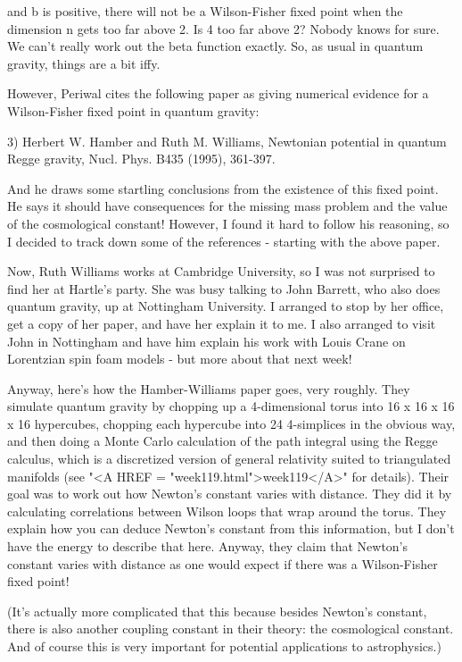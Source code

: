and b is positive, there will not be a Wilson-Fisher fixed point
when the dimension n gets too far above 2.  Is 4 too far above 2?
Nobody knows for sure.  We can't really work out the beta function
exactly.  So, as usual in quantum gravity, things are a bit iffy.

However, Periwal cites the following paper as giving numerical
evidence for a Wilson-Fisher fixed point in quantum gravity:

3) Herbert W. Hamber and Ruth M. Williams, Newtonian potential in 
quantum Regge gravity, Nucl. Phys. B435 (1995), 361-397.  

And he draws some startling conclusions from the existence of
this fixed point.  He says it should have consequences for the
missing mass problem and the value of the cosmological constant!
However, I found it hard to follow his reasoning, so I decided
to track down some of the references - starting with the above
paper.  

Now, Ruth Williams works at Cambridge University, so I was not
surprised to find her at Hartle's party.  She was busy talking
to John Barrett, who also does quantum gravity, up at Nottingham
University.  I arranged to stop by her office, get a copy of her 
paper, and have her explain it to me.  I also arranged to visit
John in Nottingham and have him explain his work with Louis Crane 
on Lorentzian spin foam models - but more about that next week!

Anyway, here's how the Hamber-Williams paper goes, very roughly.  
They simulate quantum gravity by chopping up a 4-dimensional torus 
into 16 x 16 x 16 x 16 hypercubes, chopping each hypercube into 24 
4-simplices in the obvious way, and then doing a Monte Carlo calculation 
of the path integral using the Regge calculus, which is a discretized 
version of general relativity suited to triangulated manifolds (see 
"<A HREF = "week119.html">week119</A>" for details).  Their goal 
was to work out how Newton's 
constant varies with distance.  They did it by calculating correlations
between Wilson loops that wrap around the torus.  They explain how
you can deduce Newton's constant from this information, but I don't
have the energy to describe that here.  Anyway, they claim that Newton's
constant varies with distance as one would expect if there was a 
Wilson-Fisher fixed point!

(It's actually more complicated that this because besides Newton's
constant, there is also another coupling constant in their theory:
the cosmological constant.  And of course this is very important
for potential applications to astrophysics.)

